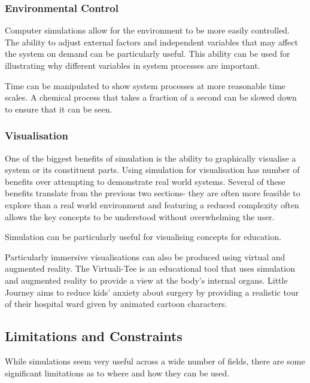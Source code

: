 \documentclass{UoYCSproject}
\begin{document}
\subsubsection{Environmental Control}
Computer simulations allow for the environment to be more easily controlled. The ability to adjust external factors and independent variables that may affect the system on demand can be particularly useful. This ability can be used for illustrating why different variables in system processes are important.

Time can be manipulated to show system processes at more reasonable time scales. A chemical process that takes a fraction of a second can be slowed down to ensure that it can be seen.




\subsubsection{Visualisation}
One of the biggest benefits of simulation is the ability to graphically visualise a system or its constituent parts. Using simulation for visualisation has number of benefits over attempting to demonstrate real world systems. Several of these benefits translate from the previous two sections- they are often more feasible to explore than a real world environment and featuring a reduced complexity often allows the key concepts to be understood without overwhelming the user.

Simulation can be particularly useful for visualising concepts for education. 

Particularly immersive visualisations can also be produced using virtual and augmented reality. The Virtuali-Tee is an educational tool that uses simulation and augmented reality to provide a view at the body's internal organs\cite{curiscope}. Little Journey aims to reduce kids' anxiety about surgery by providing a realistic tour of their hospital ward given by animated cartoon characters\cite{little_journey}.

\subsection{Limitations and Constraints}
While simulations seem very useful across a wide number of fields, there are some significant limitations as to where and how they can be used.
\end{document}
